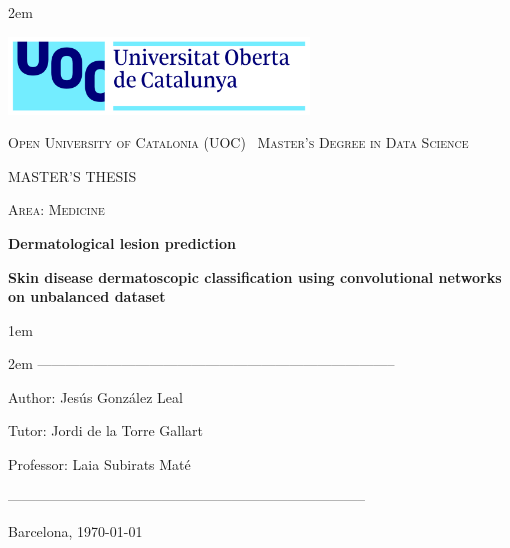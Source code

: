 \newpage
\thispagestyle{empty}

\baselineskip 2em


\centerline{\includegraphics[width=0.6\textwidth]{images/UOC-logo}}
\begin{center}
\textsc{Open University of Catalonia (UOC) \
Master's Degree in Data Science \
}


\vspace*{1.5cm}

\textsc{\Large MASTER'S THESIS}

\vspace*{0.5cm}

\textsc{\large Area: Medicine}


\vspace*{2.0cm}

\textbf{\Large Dermatological lesion prediction}

\textbf{\large Skin disease dermatoscopic classification using convolutional networks on unbalanced dataset}

\vspace{2.5cm}
\baselineskip 1em

\baselineskip 2em
-----------------------------------------------------------------------------\

Author: Jesús González Leal\

Tutor: Jordi de la Torre Gallart\

Professor: Laia Subirats Maté\

-----------------------------------------------------------------------------\

\vspace*{1.5cm}
Barcelona, \today

\end{center}

\newpage
\pagestyle{empty}
\hfill